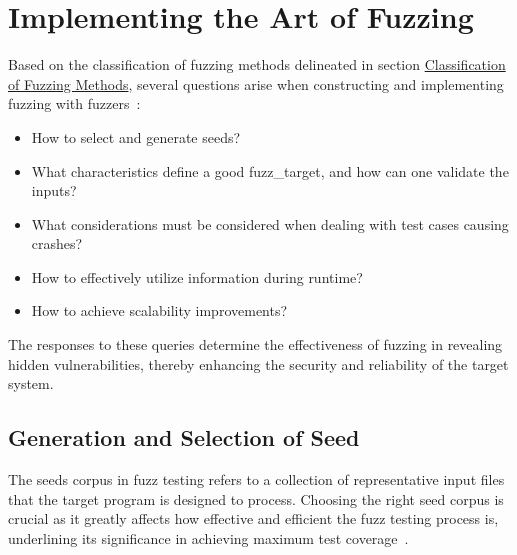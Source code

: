 



\section{Implementing the Art of Fuzzing}
Based on the classification of fuzzing methods delineated in
section \hyperref[sec:fuzzing_methods]{Classification of Fuzzing Methods},
several questions arise when constructing and implementing fuzzing with
fuzzers~\cite{liang2018fuzzing}:

\begin{itemize}
\item How to select and generate \gls{seeds}?
\item What characteristics define a good \gls{fuzz_target}, and how can one validate the inputs?
\item What considerations must be considered when dealing with test cases causing crashes?
\item How to effectively utilize information during runtime?
\item How to achieve scalability improvements?
\end{itemize}
The responses to these queries determine the effectiveness of fuzzing in
revealing hidden vulnerabilities, thereby enhancing the security and reliability of the target system.

\subsection{Generation and Selection of Seed}
The \gls{seeds} corpus in fuzz testing refers to a collection of representative input
files that the target program is designed to process. Choosing the right seed
corpus is crucial as it greatly affects how effective and efficient the fuzz
testing process is, underlining its significance in achieving maximum test
coverage~\cite{herrera2021seed}.

